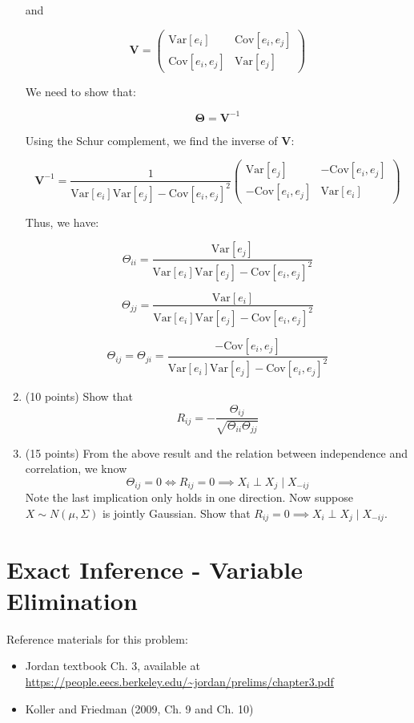 \documentclass[a3paper,12pt]{extarticle} %
\begin{document}
\begin{enumerate}
    and

    \[
    \mathbf{V} = \begin{pmatrix}
    \text{Var}[e_i] & \text{Cov}[e_i, e_j] \\
    \text{Cov}[e_i, e_j] & \text{Var}[e_j]
    \end{pmatrix}
    \]

    We need to show that:

    \[
    \mathbf{\Theta} = \mathbf{V}^{-1}
    \]

    Using the Schur complement, we find the inverse of \(\mathbf{V}\):

    \[
    \mathbf{V}^{-1} = \frac{1}{\text{Var}[e_i] \text{Var}[e_j] - \text{Cov}[e_i, e_j]^2} \begin{pmatrix}
    \text{Var}[e_j] & -\text{Cov}[e_i, e_j] \\
    -\text{Cov}[e_i, e_j] & \text{Var}[e_i]
    \end{pmatrix}
    \]

    Thus, we have:

    \[
    \Theta_{ii} = \frac{\text{Var}[e_j]}{\text{Var}[e_i] \text{Var}[e_j] - \text{Cov}[e_i, e_j]^2}
    \]

    \[
    \Theta_{jj} = \frac{\text{Var}[e_i]}{\text{Var}[e_i] \text{Var}[e_j] - \text{Cov}[e_i, e_j]^2}
    \]

    \[
    \Theta_{ij} = \Theta_{ji} = \frac{-\text{Cov}[e_i, e_j]}{\text{Var}[e_i] \text{Var}[e_j] - \text{Cov}[e_i, e_j]^2}
    \]



    \item (10 points) Show that
    \[
    R_{ij} = -\frac{\Theta_{ij}}{\sqrt{\Theta_{ii} \Theta_{jj}}}
    \]
    
    \item (15 points) From the above result and the relation between independence and correlation, we know
    \[
    \Theta_{ij} = 0 \iff R_{ij} = 0 \implies X_i \perp X_j \mid X_{-ij}
    \]
    Note the last implication only holds in one direction. Now suppose \(X \sim N(\mu, \Sigma)\) is jointly Gaussian. Show that \(R_{ij} = 0 \implies X_i \perp X_j \mid X_{-ij}\).
\end{enumerate}
\newpage

\section{Exact Inference - Variable Elimination}

Reference materials for this problem:
\begin{itemize}
    \item Jordan textbook Ch. 3, available at \url{https://people.eecs.berkeley.edu/~jordan/prelims/chapter3.pdf}
    \item Koller and Friedman (2009, Ch. 9 and Ch. 10)
\end{itemize}
\end{document}
